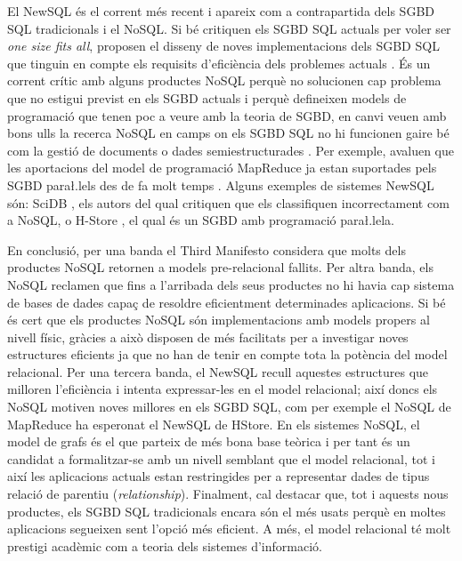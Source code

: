 El NewSQL és el corrent més recent i apareix com a contrapartida dels
SGBD SQL tradicionals i el NoSQL. Si bé critiquen els SGBD SQL actuals
per voler ser \emph{one size fits all}, proposen el disseny de noves
implementacions dels SGBD SQL que tinguin en compte els requisits
d'eficiència dels problemes
actuals \parencite{stonebraker07,stonebraker10}.  És un corrent crític
amb alguns productes NoSQL perquè no solucionen cap problema que no
estigui previst en els SGBD actuals i perquè defineixen models de
programació que tenen poc a veure amb la teoria de SGBD, en canvi
veuen amb bons ulls la recerca NoSQL en camps on els SGBD SQL no hi
funcionen gaire bé com la gestió de documents o dades
semiestructurades \parencite{stonebraker11:nocoug}.  Per exemple,
avaluen que les aportacions del model de programació MapReduce ja
estan suportades pels SGBD para\l.lels des de fa molt
temps \parencite{pavlo09:sigmod}.  Alguns exemples de sistemes NewSQL
són: SciDB \parencite{stonebraker09:scidb}, els autors del qual
critiquen que els classifiquen incorrectament com a NoSQL, o
H-Store \parencite{hstore}, el qual és un SGBD amb programació
para\l.lela.



En conclusió, per una banda el Third Manifesto considera que molts
dels productes NoSQL retornen a models pre-relacional fallits. Per
altra banda, els NoSQL reclamen que fins a l'arribada dels seus
productes no hi havia cap sistema de bases de dades capaç de resoldre
eficientment determinades aplicacions. Si bé és cert que els productes
NoSQL són implementacions amb models propers al nivell físic, gràcies
a això disposen de més facilitats per a investigar noves estructures
eficients ja que no han de tenir en compte tota la potència del model
relacional. Per una tercera banda, el NewSQL recull aquestes
estructures que milloren l'eficiència i intenta expressar-les en el
model relacional; així doncs els NoSQL motiven noves millores en els
SGBD SQL, com per exemple el NoSQL de MapReduce ha esperonat el NewSQL
de HStore. En els sistemes NoSQL, el model de grafs és el que parteix
de més bona base teòrica i per tant és un candidat a formalitzar-se
amb un nivell semblant que el model relacional, tot i així les
aplicacions actuals estan restringides per a representar dades de
tipus relació de parentiu (\emph{relationship}).  
Finalment, cal destacar que, tot i aquests nous productes, els SGBD
SQL tradicionals encara són el més usats perquè en moltes aplicacions
segueixen sent l'opció més eficient.  A més, el model relacional té
molt prestigi acadèmic com a teoria dels sistemes d'informació.



